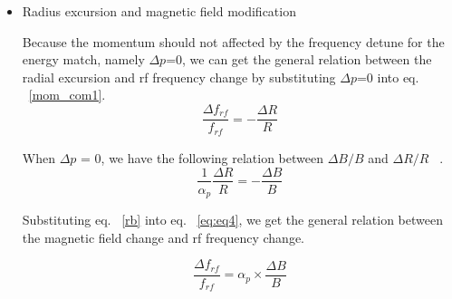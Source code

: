 \begin {itemize}
\item Radius excursion and magnetic field modification

Because the momentum should not affected by the frequency detune for the energy match, namely $\Delta p$=0, we can get the general relation between the radial excursion and rf frequency change by substituting $\Delta p$=0 into eq. ~\ref{mom_com1}.
\begin{equation}
\frac{\Delta f_{\mathit{rf}}}{f_{\mathit{rf}}} = - \frac{\Delta{R}}{R}
\label{eq:eq4}
\end{equation}



When $\Delta p$ = 0, we have the following relation between $\Delta B/B$ and $\Delta R/R$ ~\cite{werkema_differential_2001}.
%
%
\begin{equation}
\frac{1}{\alpha_p} \frac{\Delta R}{R} = -\frac{\Delta{B}}{B}\label{rb}
\end{equation}

Substituting eq. ~\ref{rb} into eq. ~\ref{eq:eq4}, we get the general relation between the magnetic field change and rf frequency change.

\begin{equation}
\frac{\Delta f_{\mathit{rf}}}{f_{\mathit{rf}}} = \alpha_p\times{\frac{\Delta{B}}{B}}
\label{eq:eq5}
\end{equation}
\end {itemize}



